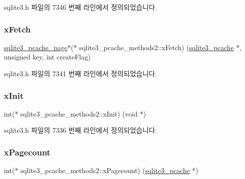 sqlite3.\+h 파일의 7346 번째 라인에서 정의되었습니다.

\mbox{\label{structsqlite3__pcache__methods2_a6283d91a6ad5037fad33003c2198c9f7}} 
\subsubsection{\texorpdfstring{x\+Fetch}{xFetch}}
{\footnotesize\ttfamily \hyperlink{structsqlite3__pcache__page}{sqlite3\+\_\+pcache\+\_\+page}$\ast$($\ast$ sqlite3\+\_\+pcache\+\_\+methods2\+::x\+Fetch) (\hyperlink{sqlite3_8h_a096c453d937d51f7926d7d31c8e0bd2f}{sqlite3\+\_\+pcache} $\ast$, unsigned key, int create\+Flag)}



sqlite3.\+h 파일의 7341 번째 라인에서 정의되었습니다.

\mbox{\label{structsqlite3__pcache__methods2_a21f7fdd82d029d3b0567c573c012adfc}} 
\subsubsection{\texorpdfstring{x\+Init}{xInit}}
{\footnotesize\ttfamily int($\ast$ sqlite3\+\_\+pcache\+\_\+methods2\+::x\+Init) (void $\ast$)}



sqlite3.\+h 파일의 7336 번째 라인에서 정의되었습니다.

\mbox{\label{structsqlite3__pcache__methods2_a16b85f7889b050702c739eccf2f0c036}} 
\subsubsection{\texorpdfstring{x\+Pagecount}{xPagecount}}
{\footnotesize\ttfamily int($\ast$ sqlite3\+\_\+pcache\+\_\+methods2\+::x\+Pagecount) (\hyperlink{sqlite3_8h_a096c453d937d51f7926d7d31c8e0bd2f}{sqlite3\+\_\+pcache} $\ast$)}



